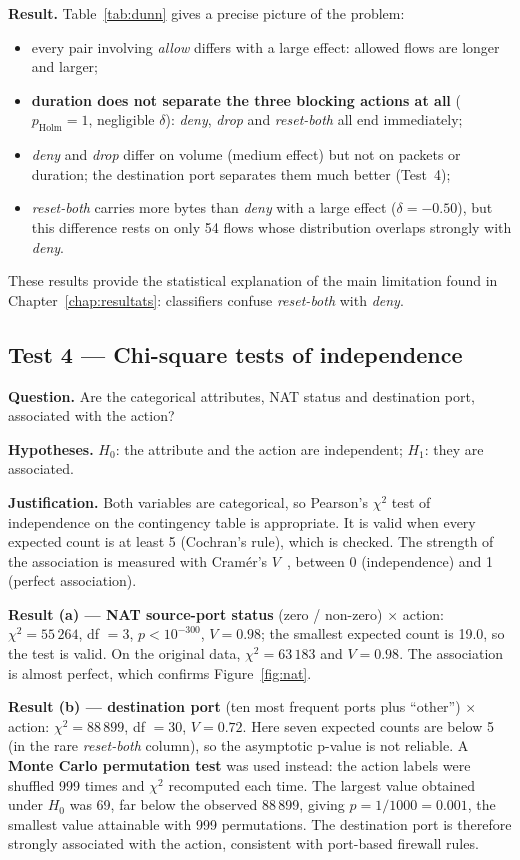 \textbf{Result.} Table~\ref{tab:dunn} gives a precise picture of the problem:
\begin{itemize}
  \item every pair involving \emph{allow} differs with a large effect: allowed flows are longer and larger;
  \item \textbf{duration does not separate the three blocking actions at all} ($p_{\text{Holm}} = 1$, negligible $\delta$): \emph{deny}, \emph{drop} and \emph{reset-both} all end immediately;
  \item \emph{deny} and \emph{drop} differ on volume (medium effect) but not on packets or duration; the destination port separates them much better (Test~4);
  \item \emph{reset-both} carries more bytes than \emph{deny} with a large effect ($\delta = -0.50$), but this difference rests on only 54 flows whose distribution overlaps strongly with \emph{deny}.
\end{itemize}
These results provide the statistical explanation of the main limitation found in Chapter~\ref{chap:resultats}: classifiers confuse \emph{reset-both} with \emph{deny}.

\subsection{Test 4 --- Chi-square tests of independence}
\textbf{Question.} Are the categorical attributes, \ac{NAT} status and destination port, associated with the action?

\textbf{Hypotheses.} $H_0$: the attribute and the action are independent; $H_1$: they are associated.

\textbf{Justification.} Both variables are categorical, so Pearson's $\chi^2$ test of independence on the contingency table is appropriate. It is valid when every expected count is at least 5 (Cochran's rule), which is checked. The strength of the association is measured with Cramér's $V$~\cite{cramer1946mathematical}, between 0 (independence) and 1 (perfect association).

\textbf{Result (a) --- NAT source-port status} (zero / non-zero) $\times$ action: $\chi^2 = 55\,264$, df $= 3$, $p < 10^{-300}$, $V = 0.98$; the smallest expected count is 19.0, so the test is valid. On the original data, $\chi^2 = 63\,183$ and $V = 0.98$. The association is almost perfect, which confirms Figure~\ref{fig:nat}.

\textbf{Result (b) --- destination port} (ten most frequent ports plus ``other'') $\times$ action: $\chi^2 = 88\,899$, df $= 30$, $V = 0.72$. Here seven expected counts are below 5 (in the rare \emph{reset-both} column), so the asymptotic p-value is not reliable. A \textbf{Monte Carlo permutation test} was used instead: the action labels were shuffled 999 times and $\chi^2$ recomputed each time. The largest value obtained under $H_0$ was 69, far below the observed 88\,899, giving $p = 1/1000 = 0.001$, the smallest value attainable with 999 permutations. The destination port is therefore strongly associated with the action, consistent with port-based firewall rules.

